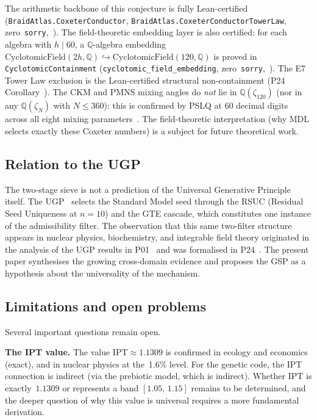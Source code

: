 \documentclass[11pt]{article}
\theoremstyle{remark}
\newcommand{\IPT}{\mathrm{IPT}}
\newcommand{\zetaN}[1]{\zeta_{#1}}
\newcommand{\lean}[1]{\texttt{#1}}
\begin{document}
\noindent The arithmetic backbone of this conjecture is fully Lean-certified
(\lean{BraidAtlas.CoxeterConductor}, \lean{BraidAtlas.CoxeterConductorTowerLaw},
zero~\lean{sorry},~\cite{ugp-lean}).
The field-theoretic embedding layer is also certified:
for each algebra with $h\mid 60$, a $\mathbb{Q}$-algebra embedding
$\mathrm{CyclotomicField}(2h,\mathbb{Q})\hookrightarrow\mathrm{CyclotomicField}(120,\mathbb{Q})$
is proved in \lean{CyclotomicContainment}
(\lean{cyclotomic\_field\_embedding}, zero~\lean{sorry},~\cite{ugp-lean}).
The E7 Tower Law exclusion is the Lean-certified structural non-containment
(P24 Corollary~\cite{Spivack2026_Uniqueness25}).
The CKM and PMNS mixing angles do \emph{not} lie in $\mathbb{Q}(\zetaN{120})$
(nor in any $\mathbb{Q}(\zeta_N)$ with $N\leq 360$): this is confirmed by
PSLQ at 60 decimal digits across all eight mixing parameters~\cite{Spivack2026_Uniqueness25}.
The field-theoretic interpretation (why MDL selects exactly these Coxeter numbers)
is a subject for future theoretical work.

\subsection{Relation to the UGP}

The two-stage sieve is not a prediction of the Universal Generative Principle itself.
The UGP~\cite{SpivackUGP,Spivack2025_ParticlePhysics} selects the Standard Model
seed through the RSUC (Residual Seed Uniqueness at $n=10$) and the GTE cascade,
which constitutes one instance of the admissibility filter.
The observation that this same two-filter structure appears in nuclear physics,
biochemistry, and integrable field theory originated in the analysis of the UGP
results in P01~\cite{Spivack2026_SM_UGP} and was formalised in
P24~\cite{Spivack2026_Uniqueness25}.
The present paper synthesises the growing cross-domain evidence and proposes the
GSP as a hypothesis about the universality of the mechanism.

\subsection{Limitations and open problems}

Several important questions remain open.

\textbf{The IPT value.}
The value $\IPT \approx 1.1309$ is confirmed in ecology and economics (exact), and in nuclear
physics at the~1.6\% level.
For the genetic code, the IPT connection is indirect (via the prebiotic model, which
is indirect).
Whether $\IPT$ is exactly~$1.1309$ or represents a band
$[1.05,\, 1.15]$ remains to be determined, and the deeper question of why this value
is universal requires a more fundamental derivation.
\end{document}

